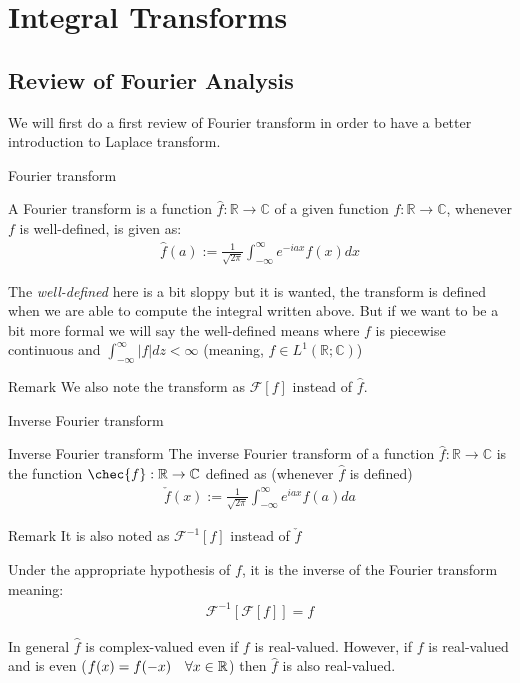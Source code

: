 \chapter{Integral Transforms}
\section{Review of Fourier Analysis}
We will first do a first review of Fourier transform in order to have a better introduction to Laplace transform.
\begin{parag}{Fourier transform}
	\begin{definition}
	
    A Fourier transform is a function $\hat{f}: \mathbb{R} \to \mathbb{C}$ of a given function $f : \mathbb{R} \to \mathbb{C}$, whenever $f$ is well-defined, is given as:
	\begin{align*} 
		\hat{f}\left(a\right) := \frac{1}{\sqrt{2\pi}} \int_{-\infty}^{\infty} e^{-iax}f\left(x\right)dx
	\end{align*}
	\end{definition}
	The \textit{well-defined} here is a bit sloppy but it is wanted, the transform is defined when we are able to compute the integral written above. But if we want to be a bit more formal we will say the well-defined means where $f$ is piecewise continuous and $\int_{-\infty}^{\infty}\left|f\right|dz < \infty$ (meaning, $f \in L^{1}\left( \mathbb{R}; \mathbb{C}\right)$)
	\begin{subparag}{Remark}
	    We also note the transform as $\mathcal{F}\left[f\right]$ instead of $\hat{f}$.
	\end{subparag}
\end{parag}

\begin{parag}{Inverse Fourier transform}
	\begin{definition}{Inverse Fourier transform}
		The inverse Fourier transform of a function $\hat{f}: \mathbb{R} \to\mathbb{C}$ is the function $\chec{f}: \mathbb{R} \to \mathbb{C}$ defined as (whenever $\hat{f}$ is defined)
		\begin{align*} 
			\check{f}\left(x\right) := \frac{1}{\sqrt{2\pi}}\int_{-\infty}^{\infty}e^{iax}f\left(a\right)da
		\end{align*}
    \end{definition}
	\begin{subparag}{Remark}
		It is also noted as $\mathcal{F}^{-1}\left[f\right]$ instead of $\check{f}$
	\end{subparag}
	Under the appropriate hypothesis of $f$, it is the inverse of the Fourier transform meaning:
	\begin{align*} 
		\mathcal{F}^{-1}\left[\mathcal{F}\left[f\right]\right] = f
	\end{align*}
\end{parag}
\begin{framedremark}
In general $\hat{f}$ is complex-valued even if $f$ is real-valued. However, if $f$ is real-valued and is even ($f\left(x\right) =  f\left(-x\right) \mathspace \forall x \in \mathbb{R}$) then $\hat{f}$ is also real-valued.
\end{framedremark}



